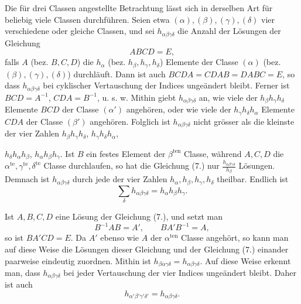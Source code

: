 \documentclass[11pt]{article}
\begin{document}
Die für drei Classen angestellte Betrachtung lässt sich in derselben Art für beliebig viele Classen durchführen. Seien etwa $(\alpha),(\beta),(\gamma),(\delta)$ vier verschiedene oder gleiche Classen, und sei $h_{\alpha\beta\gamma\delta}$ die Anzahl der Lösungen der Gleichung
\begin{equation*}\tag{7.}
ABCD=E,
\end{equation*}
falls $A$ (bez. $B,C,D$) die $h_\alpha$ (bez. $h_\beta,h_\gamma,h_\delta$) Elemente der Classe $(\alpha)$ (bez. $(\beta),(\gamma),(\delta)$) durchläuft. Dann ist auch $BCDA=CDAB=DABC=E$, so dass $h_{\alpha\beta\gamma\delta}$ bei cyklischer Vertauschung der Indices ungeändert bleibt. Ferner ist $BCD=A^{-1}$, $CDA=B^{-1}$, u. s. w. Mithin giebt $h_{\alpha\beta\gamma\delta}$ an, wie viele der $h_\beta h_\gamma h_\delta$ Elemente $BCD$ der Classe $(\alpha')$ angehören, oder wie viele der $h_\gamma h_\delta h_\alpha$ Elemente $CDA$ der Classe $(\beta')$ angehören. Folglich ist $h_{\alpha\beta\gamma\delta}$ nicht grösser als die kleinste der vier Zahlen $h_\beta h_\gamma h_\delta$, $h_\gamma h_\delta h_\alpha$,


$h_\delta h_\alpha h_\beta$, $h_\alpha h_\beta h_\gamma$. Ist $B$ ein festes Element der $\beta^{\mathrm{ten}}$ Classe, während $A,C,D$ die $\alpha^{\mathrm{te}},\gamma^{\mathrm{te}},\delta^{\mathrm{te}}$ Classe durchlaufen, so hat die Gleichung (7.) nur $\frac{h_{\alpha\beta\gamma\delta}}{h_\beta}$ Lösungen. Demnach ist $h_{\alpha\beta\gamma\delta}$ durch jede der vier Zahlen $h_\alpha,h_\beta,h_\gamma,h_\delta$ theilbar. Endlich ist
\begin{equation*}\tag{8.}
\sum_\delta h_{\alpha\beta\gamma\delta}=h_\alpha h_\beta h_\gamma.
\end{equation*}

Ist $A,B,C,D$ eine Lösung der Gleichung (7.), und setzt man
\[
B^{-1}AB=A',\qquad BA'B^{-1}=A,
\]
so ist $BA'CD=E$. Da $A'$ ebenso wie $A$ der $\alpha^{\mathrm{ten}}$ Classe angehört, so kann man auf diese Weise die Lösungen dieser Gleichung und der Gleichung (7.) einander paarweise eindeutig zuordnen. Mithin ist $h_{\beta\alpha\gamma\delta}=h_{\alpha\beta\gamma\delta}$. Auf diese Weise erkennt man, dass $h_{\alpha\beta\gamma\delta}$ bei jeder Vertauschung der vier Indices ungeändert bleibt. Daher ist auch
\begin{equation*}\tag{9.}
h_{\alpha'\beta'\gamma'\delta'}=h_{\alpha\beta\gamma\delta}.
\end{equation*}
\end{document}
